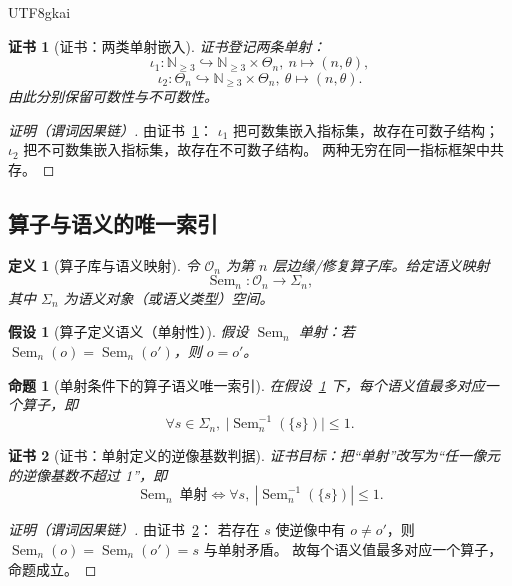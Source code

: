 \documentclass[12pt]{article}
\newtheorem{definition}{定义}[section]
\newtheorem{assumption}{假设}[section]
\newtheorem{proposition}{命题}[section]
\newtheorem{Certificate}{证书}[section]
\begin{document}
\begin{CJK*}{UTF8}{gkai}
\begin{Certificate}[证书：两类单射嵌入]\label{cert:two-infinities}
证书登记两条单射：
\[
\iota_1:\mathbb N_{\ge3}\hookrightarrow \mathbb N_{\ge3}\times\Theta_n,\ n\mapsto(n,\theta),
\]
\[
\iota_2:\Theta_n\hookrightarrow \mathbb N_{\ge3}\times\Theta_n,\ \theta\mapsto(n,\theta).
\]
由此分别保留可数性与不可数性。
\end{Certificate}

\begin{proof}[证明（谓词因果链）]
由证书~\ref{cert:two-infinities}：
\(
\iota_1
\)
把可数集嵌入指标集，故存在可数子结构；
\(
\iota_2
\)
把不可数集嵌入指标集，故存在不可数子结构。
两种无穷在同一指标框架中共存。
\end{proof}

\subsection{算子与语义的唯一索引}

\begin{definition}[算子库与语义映射]\label{def:op-sem}
令 $\mathcal O_n$ 为第 $n$ 层边缘/修复算子库。给定语义映射
\[
\operatorname{Sem}_n:\mathcal O_n\to \Sigma_n,
\]
其中 $\Sigma_n$ 为语义对象（或语义类型）空间。
\end{definition}

\begin{assumption}[算子定义语义（单射性）]\label{ass:sem-inj}
假设 $\operatorname{Sem}_n$ 单射：若 $\operatorname{Sem}_n(o)=\operatorname{Sem}_n(o')$，则 $o=o'$。
\end{assumption}

\begin{proposition}[单射条件下的算子语义唯一索引]\label{prop:sem-unique-index}
在假设~\ref{ass:sem-inj} 下，每个语义值最多对应一个算子，即
\[
\forall s\in\Sigma_n,\ \bigl|\operatorname{Sem}_n^{-1}(\{s\})\bigr|\le 1.
\]
\end{proposition}

\begin{Certificate}[证书：单射定义的逆像基数判据]\label{cert:sem-unique-index}
证书目标：把“单射”改写为“任一像元的逆像基数不超过 1”，即
\[
\operatorname{Sem}_n\ \text{单射}
\Longleftrightarrow
\forall s,\ |\operatorname{Sem}_n^{-1}(\{s\})|\le 1.
\]
\end{Certificate}

\begin{proof}[证明（谓词因果链）]
由证书~\ref{cert:sem-unique-index}：
若存在 $s$ 使逆像中有 $o\neq o'$，则
\(
\operatorname{Sem}_n(o)=\operatorname{Sem}_n(o')=s
\)
与单射矛盾。
故每个语义值最多对应一个算子，命题成立。
\end{proof}


\end{CJK*}
\end{document}
